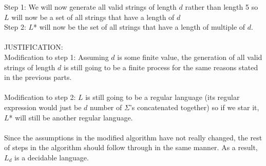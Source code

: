 \documentclass[11pt]{article}
\theoremstyle{definition}
\theoremstyle{theorem}
\begin{document}
\begin{enumerate}[label=(\alph*)]
Step 1: We will now generate all valid strings of length $d$ rather than length 5 so $L$ will now be a set of all strings that have a length of $d$ \\

Step 2: $L$* will now be the set of all strings that have a length of multiple of $d$. \\ ~ \\

JUSTIFICATION: \\
Modification to step 1: Assuming $d$ is some finite value, the generation of all valid strings of length $d$ is still going to be a finite process for the same reasons stated in the previous parts. \\~\\ 
Modification to step 2: $L$ is still going to be a regular language (its regular expression would just be $d$ number of $\Sigma$'s concatenated together) so if we star it, $L$* will still be another regular language. \\~\\ 

Since the assumptions in the modified algorithm have not really changed, the rest of steps in the algorithm should follow through in the same manner. As a result, $L_{d}$ is a decidable language. 


\end{enumerate}
\end{document}
